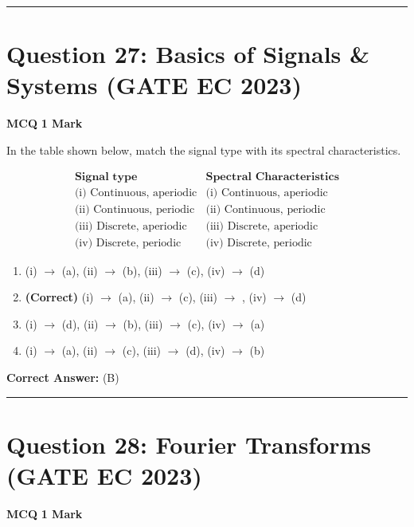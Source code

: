 \documentclass[11pt,a4paper]{article}
\begin{document}
\vspace{1.5em}
\hrule
\vspace{1.5em}

\section*{Question 27: Basics of Signals \& Systems (GATE EC 2023)}
\noindent \textbf{\color{primary}MCQ} \hfill \textbf{\color{secondary}1 Mark}


\noindent In the table shown below, match the signal type with its spectral characteristics.

\[
\begin{array}{ll}
\textbf{Signal type} &\textbf{Spectral Characteristics}\\
\text{(i) Continuous, aperiodic}& \text{(i) Continuous, aperiodic}\\
\text{(ii) Continuous, periodic}& \text{(ii) Continuous, periodic}\\
\text{(iii) Discrete, aperiodic}& \text{(iii) Discrete, aperiodic}\\
\text{(iv) Discrete, periodic} & \text{(iv) Discrete, periodic}
\end{array}
\]


\begin{enumerate}[label=(\Alph*)]
    \item (i) $\rightarrow$ (a), (ii) $\rightarrow$ (b), (iii) $\rightarrow$ (c), (iv) $\rightarrow$ (d)
    \item \textbf{(Correct)} (i) $\rightarrow$ (a), (ii) $\rightarrow$ (c), (iii) $\rightarrow$ , (iv) $\rightarrow$ (d)
    \item (i) $\rightarrow$ (d), (ii) $\rightarrow$ (b), (iii) $\rightarrow$ (c), (iv) $\rightarrow$ (a)
    \item (i) $\rightarrow$ (a), (ii) $\rightarrow$ (c), (iii) $\rightarrow$ (d), (iv) $\rightarrow$ (b)
\end{enumerate}

\noindent \textbf{Correct Answer:} (B)


\vspace{1.5em}
\hrule
\vspace{1.5em}

\section*{Question 28: Fourier Transforms (GATE EC 2023)}
\noindent \textbf{\color{primary}MCQ} \hfill \textbf{\color{secondary}1 Mark}
\end{document}
